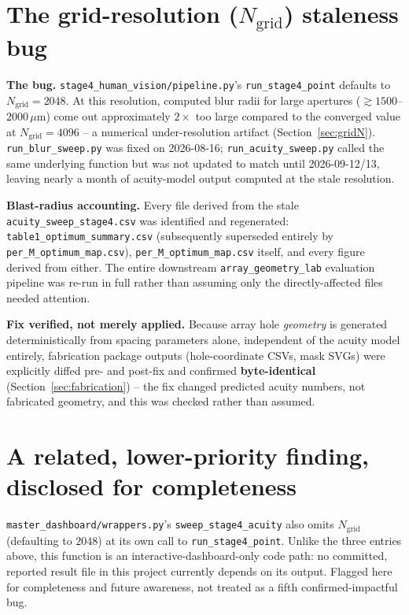 \section{The grid-resolution ($N_{\mathrm{grid}}$) staleness bug}
\label{sec:bug-gridN}
\textbf{The bug.} \texttt{stage4\_human\_vision/pipeline.py}'s \texttt{run\_stage4\_point}
defaults to $N_{\mathrm{grid}}=2048$. At this resolution, computed blur radii for large
apertures ($\gtrsim1500$--$2000\,\mu$m) come out approximately $2\times$ too large
compared to the converged value at $N_{\mathrm{grid}}=4096$ -- a numerical
under-resolution artifact (Section~\ref{sec:gridN}). \texttt{run\_blur\_sweep.py} was
fixed on 2026-08-16; \texttt{run\_acuity\_sweep.py} called the same underlying function
but was not updated to match until 2026-09-12/13, leaving nearly a month of
acuity-model output computed at the stale resolution.

\textbf{Blast-radius accounting.} Every file derived from the stale
\texttt{acuity\_sweep\_stage4.csv} was identified and regenerated:
\texttt{table1\_optimum\_summary.csv} (subsequently superseded entirely by
\texttt{per\_M\_optimum\_map.csv}), \texttt{per\_M\_optimum\_map.csv} itself, and every
figure derived from either. The entire downstream \texttt{array\_geometry\_lab}
evaluation pipeline was re-run in full rather than assuming only the directly-affected
files needed attention.

\textbf{Fix verified, not merely applied.} Because array hole \emph{geometry} is
generated deterministically from spacing parameters alone, independent of the acuity
model entirely, fabrication package outputs (hole-coordinate CSVs, mask SVGs) were
explicitly diffed pre- and post-fix and confirmed \textbf{byte-identical}
(Section~\ref{sec:fabrication}) -- the fix changed predicted acuity numbers, not
fabricated geometry, and this was checked rather than assumed.

\section{A related, lower-priority finding, disclosed for completeness}
\label{sec:bug-dashboard}
\texttt{master\_dashboard/wrappers.py}'s \texttt{sweep\_stage4\_acuity} also omits
$N_{\mathrm{grid}}$ (defaulting to $2048$) at its own call to
\texttt{run\_stage4\_point}. Unlike the three entries above, this function is an
interactive-dashboard-only code path: no committed, reported result file in this
project currently depends on its output. Flagged here for completeness and future
awareness, not treated as a fifth confirmed-impactful bug.
